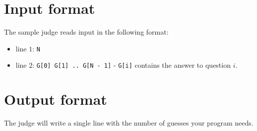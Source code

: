 \section*{Input format}
The sample judge reads input in the following format:

\begin{itemize}
  \item line $1$: \texttt{N}
  \item line $2$: \texttt{G[0] G[1] .. G[N - 1]} - \texttt{G[i]} contains the answer to question $i$.
\end{itemize}

\section*{Output format}
The judge will write a single line with the number of guesses your program needs.
